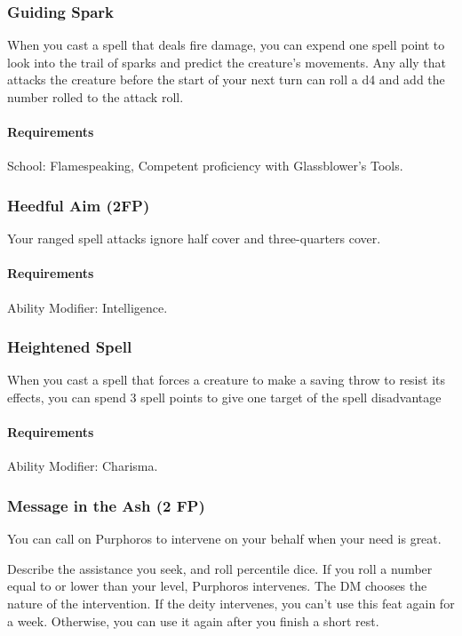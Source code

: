 \subsubsection{Guiding Spark} \label{feat::guidingspark}
    When you cast a spell that deals fire damage, you can expend one spell point to look into the trail of sparks and predict the creature's movements.
    Any ally that attacks the creature before the start of your next turn can roll a d4 and add the number rolled to the attack roll.
    \paragraph{Requirements} School: Flamespeaking, Competent proficiency with Glassblower's Tools.
\subsubsection{Heedful Aim (2FP)} \label{feat::heedfulaim}
    Your ranged spell attacks ignore half cover and three-quarters cover.
    \paragraph{Requirements} Ability Modifier: Intelligence.
\subsubsection{Heightened Spell} \label{feat::heightenedspell}
    When you cast a spell that forces a creature to make a saving throw to resist its effects, you can spend 3 spell points to give one target of the spell disadvantage
    \paragraph{Requirements} Ability Modifier: Charisma.
\subsubsection{Message in the Ash (2 FP)} \label{feat::messageintheash}
    You can call on Purphoros to intervene on your behalf when your need is great.

    Describe the assistance you seek, and roll percentile dice.
    If you roll a number equal to or lower than your level, Purphoros intervenes.
    The DM chooses the nature of the intervention.
    If the deity intervenes, you can't use this feat again for a week.
    Otherwise, you can use it again after you finish a short rest.

